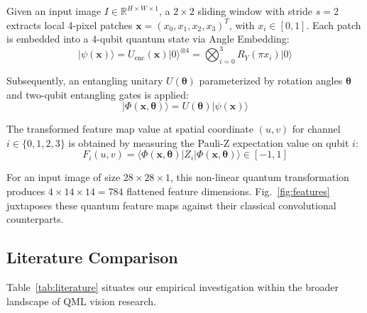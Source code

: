 \documentclass[runningheads]{llncs}
\begin{document}
Given an input image $I \in \mathbb{R}^{H \times W \times 1}$, a $2 \times 2$ sliding window with stride $s=2$ extracts local 4-pixel patches $\mathbf{x} = (x_0, x_1, x_2, x_3)^T$, with $x_i \in [0, 1]$. Each patch is embedded into a 4-qubit quantum state via Angle Embedding:
\begin{equation}
|\psi(\mathbf{x})\rangle = U_{\text{enc}}(\mathbf{x}) |0\rangle^{\otimes 4} = \bigotimes_{i=0}^{3} R_Y(\pi x_i) |0\rangle
\end{equation}

Subsequently, an entangling unitary $U(\boldsymbol{\theta})$ parameterized by rotation angles $\boldsymbol{\theta}$ and two-qubit entangling gates is applied:
\begin{equation}
|\Phi(\mathbf{x}, \boldsymbol{\theta})\rangle = U(\boldsymbol{\theta}) |\psi(\mathbf{x})\rangle
\end{equation}

The transformed feature map value at spatial coordinate $(u, v)$ for channel $i \in \{0, 1, 2, 3\}$ is obtained by measuring the Pauli-Z expectation value on qubit $i$:
\begin{equation}
F_i(u, v) = \langle \Phi(\mathbf{x}, \boldsymbol{\theta}) | Z_i | \Phi(\mathbf{x}, \boldsymbol{\theta}) \rangle \in [-1, 1]
\end{equation}

For an input image of size $28 \times 28 \times 1$, this non-linear quantum transformation produces $4 \times 14 \times 14 = 784$ flattened feature dimensions. Fig.~\ref{fig:features} juxtaposes these quantum feature maps against their classical convolutional counterparts.

\subsection{Literature Comparison}
Table~\ref{tab:literature} situates our empirical investigation within the broader landscape of QML vision research.
\end{document}

